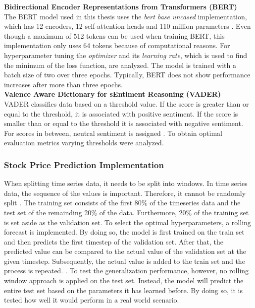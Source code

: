 \documentclass[11pt, a4paper]{article}
\begin{document}
\noindent\textbf{Bidirectional Encoder Representations from Transformers (BERT)}\\
The BERT model used in this thesis uses the \emph{bert base uncased} implementation, which has 12 encoders, 12 self-attention heads and
110 million parameters \citep{devlin2019bert}. Even though a maximum of 512 tokens can be used when training BERT, this implementation only uses 64 tokens because of computational reasons.
For hyperparameter tuning the \emph{optimizer} and its \emph{learning rate}, which is used to find the minimum of the loss function, are analyzed.
The model is trained with a batch size of two over three epochs. Typically, BERT does not show performance increases after more than three epochs.\\

\noindent\textbf{Valence Aware Dictionary for sEntiment Reasoning (VADER)}\\
VADER classifies data based on a threshold value.
If the score is greater than or equal to the threshold, it is associated with positive sentiment. If the score is smaller than or equal to the threshold it is associated with negative sentiment. For scores
in between, neutral sentiment is assigned \citep{hutto2015vader}. To obtain optimal evaluation metrics varying thresholds were analyzed.

\subsubsection{Stock Price Prediction Implementation}
When splitting time series data, it needs to be split into windows. In time series data, the sequence of the values is important.
Therefore, it cannot be randomly split \citep{lebaron1998split}.
The training set consists of the first 80\% of the timeseries data and the test set of the remainding 20\% of the data. Furthermore, 20\% of the training set is set aside as the validation set.
To select the optimal hyperparameters, a rolling forecast is implemented. 
By doing so, the model is first trained on the train set and then predicts the first timestep of the validation set. After that, the
predicted value can be compared to the actual value of the validation set at the given timestep. Subsequently, the actual value
is added to the train set and the process is repeated. \citep{sima2018timeseries}. To test the generalization performance, however, no
rolling window approach is applied on the test set. Instead, the model will predict the entire test set based on the parameters
it has learned before. By doing so, it is tested how well it would perform in a real world scenario.\\
\end{document}
